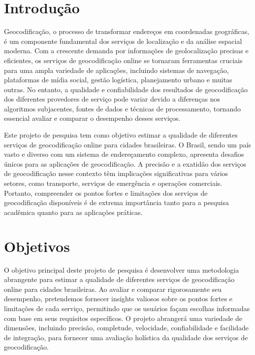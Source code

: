 \documentclass{article}
\begin{document}
\section{Introdução}
	
Geocodificação, o processo de transformar endereços em coordenadas geográficas, é um componente fundamental dos serviços de localização e da análise espacial moderna. Com a crescente demanda por informações de geolocalização precisas e eficientes, os serviços de geocodificação online se tornaram ferramentas cruciais para uma ampla variedade de aplicações, incluindo sistemas de navegação, plataformas de mídia social, gestão logística, planejamento urbano e muitas outras. No entanto, a qualidade e confiabilidade dos resultados de geocodificação dos diferentes provedores de serviço pode variar devido a diferenças nos algoritmos subjacentes, fontes de dados e técnicas de processamento, tornando essencial avaliar e comparar o desempenho desses serviços.

Este projeto de pesquisa tem como objetivo estimar a qualidade de diferentes serviços de geocodificação online para cidades brasileiras. O Brasil, sendo um país vasto e diverso com um sistema de endereçamento complexo, apresenta desafios únicos para as aplicações de geocodificação. A precisão e a exatidão dos serviços de geocodificação nesse contexto têm implicações significativas para vários setores, como transporte, serviços de emergência e operações comerciais. Portanto, compreender os pontos fortes e limitações dos serviços de geocodificação disponíveis é de extrema importância tanto para a pesquisa acadêmica quanto para as aplicações práticas.	
   
\section{Objetivos}

O objetivo principal deste projeto de pesquisa é desenvolver uma metodologia abrangente para estimar a qualidade de diferentes serviços de geocodificação online para cidades brasileiras. Ao avaliar e comparar rigorosamente seu desempenho, pretendemos fornecer insights valiosos sobre os pontos fortes e limitações de cada serviço, permitindo que os usuários façam escolhas informadas com base em seus requisitos específicos. O projeto abrangerá uma variedade de dimensões, incluindo precisão, completude, velocidade, confiabilidade e facilidade de integração, para fornecer uma avaliação holística da qualidade dos serviços de geocodificação.
   
\end{document}
